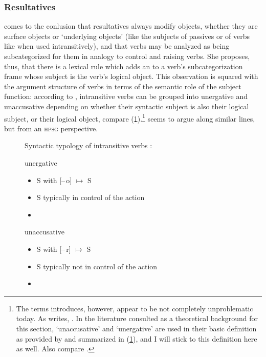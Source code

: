 \subsubsection{Resultatives}
\label{subsubsec:res}

\citet{simpson1983} comes to the conlusion that resultatives always modify
objects, whether they are surface objects or `underlying objects' (like the
subjects of passives or of verbs like  when used intransitively),
and that verbs may be analyzed as being subcategorized for them in analogy to
control and raising verbs. She proposes, thus, that there is a lexical rule
which adds an \XCompl{} to a verb's subcategorization frame whose subject is
the verb's logical object. This observation is squared with the argument
structure of verbs in terms of the semantic role of the subject function:
according to \citet{perlmutter1978}, intransitive verbs can be grouped into
unergative and unaccusative depending on whether their syntactic subject is
also their logical subject, or their logical object, compare
(\ref{ex:verbtyp}).\footnote{The terms \citet{perlmutter1978} introduces,
however, appear to be not completely unproblematic today. As \citet{dixon2010b}
writes, . In the literature consulted as a theoretical background for this
section, `unaccusative' and `unergative' are used in their basic definition as
provided by \citet{perlmutter1978} and summarized in (\ref{ex:verbtyp}), and I
will stick to this definition here as well. Also compare
\citet[334--336]{bresnan2016}.} \citet{mueller2002} seems to argue along
similar lines, but from an \textsc{hpsg} perspective.

\begin{figure}
\pex\label{ex:verbtyp}%
Syntactic typology of intransitive verbs
\parencites{perlmutter1978}{bresnan2016}:
\a \begin{minipage}[t]{\remaining}
	unergative
	\begin{itemize}[leftmargin=*]
		\item S with [–\,o] $\mapsto$ S
		\item S typically in control of the action
		\item {}
	\end{itemize}
	\end{minipage}

\a \begin{minipage}[t]{\remaining}
	unaccusative
	\begin{itemize}[leftmargin=*]
		\item S with [–\,r] $\mapsto$ S
		\item S typically not in control of the action
		\item {}
	\end{itemize}
	\end{minipage}
\xe
\end{figure}

